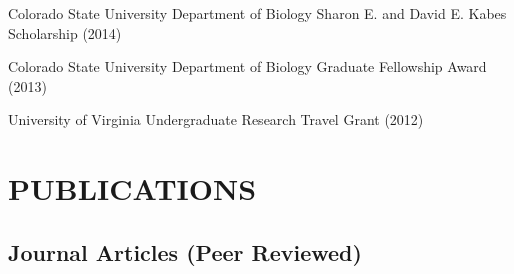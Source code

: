 \documentclass{cv}
\begin{document}
Colorado State University Department of Biology Sharon E. and David E. Kabes Scholarship (2014) %

Colorado State University Department of Biology Graduate Fellowship Award (2013) %

University of Virginia Undergraduate Research Travel Grant (2012) %



\section*{PUBLICATIONS}

\subsection*{Journal Articles (Peer Reviewed)}
\end{document}
